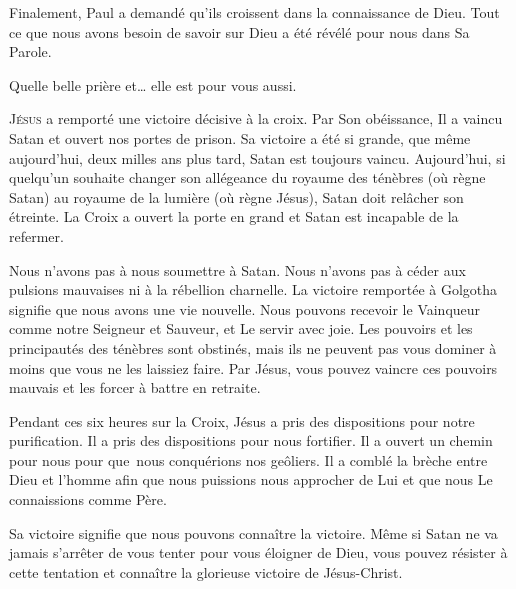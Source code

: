 Finalement, Paul a demandé qu'ils croissent dans la connaissance de Dieu.
 Tout ce que nous avons besoin de savoir sur Dieu a été révélé
 pour nous dans Sa Parole.

Quelle belle prière et\dots{} elle est pour vous aussi.

\dvrule






\lettrine{J}{ésus} a remporté une victoire décisive à la croix.
 Par Son obéissance, Il a vaincu Satan et ouvert nos portes de prison.
 Sa victoire a été si grande, que même aujourd'hui, deux milles ans plus tard,
 Satan est toujours vaincu. Aujourd'hui, si quelqu'un souhaite changer
 son allégeance du royaume des ténèbres (où règne Satan)
 au royaume de la lumière (où règne Jésus), Satan doit relâcher son étreinte.
 La Croix  a ouvert la porte en grand
 \ocadr et Satan est incapable de la refermer.


Nous n'avons pas à nous soumettre à Satan. Nous n'avons pas à céder
 aux pulsions mauvaises ni à la rébellion charnelle.
 La victoire remportée à Golgotha  signifie que
 nous avons une vie nouvelle. Nous pouvons recevoir le Vainqueur
 comme notre Seigneur et Sauveur, et Le servir avec joie.
 Les pouvoirs et les principautés des ténèbres sont obstinés,
 mais ils ne peuvent pas vous dominer à moins que vous ne les laissiez faire.
 Par Jésus, vous pouvez vaincre ces pouvoirs mauvais et les forcer
 à battre en retraite.

Pendant ces six heures sur la Croix, Jésus a pris des dispositions
 pour notre purification. Il a pris des dispositions pour nous fortifier.
 Il a ouvert un chemin pour nous pour que~nous conquérions nos geôliers.
 Il a comblé la brèche entre Dieu et l'homme afin que nous puissions
 nous approcher de Lui et que nous Le connaissions comme Père.

Sa victoire signifie que nous pouvons connaître la victoire.
 Même si Satan ne va jamais s'arrêter de vous tenter pour vous éloigner
 de Dieu, vous pouvez résister à cette tentation et connaître
 la glorieuse victoire de Jésus-Christ. 

